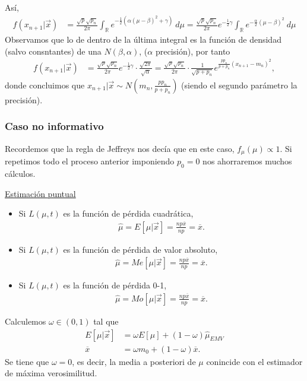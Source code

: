 Así,
\begin{align*}
    f(x_{n+1} | \vec{x}) & = \frac{\sqrt{p}\sqrt{p_n}}{2\pi} \int_{\mathbb{R}} e^{-\frac{1}{2}(\alpha(\mu- \beta)^2 + \gamma)} \ d\mu =  \frac{\sqrt{p}\sqrt{p_n}}{2\pi}e^{-\frac{1}{2}\gamma} \int_{\mathbb{R}} e^{-\frac{\alpha}{2}(\mu- \beta)^2 } \ d\mu
\end{align*}
Observamos que lo de dentro de la última integral es la función de densidad (salvo consntantes) de una $N(\beta,\alpha)$, ($\alpha$ precisión), por tanto
\begin{align*}
    f(x_{n+1} | \vec{x}) & = \frac{\sqrt{p}\sqrt{p_n}}{2\pi}e^{-\frac{1}{2}\gamma} \cdot \frac{\sqrt{2\pi}}{\sqrt{\alpha}} = \frac{\sqrt{p}\sqrt{p_n}}{2\pi} \cdot \frac{1}{\sqrt{p+p_n}}e^{\frac{pp_n}{p+p_n}(x_{n+1} - m_n)^2},
\end{align*}
donde concluimos que $x_{n+1} | \vec{x} \sim N\left( m_n, \frac{pp_n}{p + p_n} \right)$ (siendo el segundo parámetro la precisión).

\subsubsection{Caso no informativo}
Recordemos que la regla de Jeffreys nos decía que en este caso, $f_{\mu}(\mu) \propto 1$. Si repetimos todo el proceso anterior imponiendo $p_0 =0$ nos ahorraremos muchos cálculos.

\underline{Estimación puntual}
\begin{itemize}
    \item Si $L(\mu,t)$ es la función de pérdida cuadrática,
          \begin{align*}
              \widehat{\mu} = E[\mu |  \vec{x}] = \frac{np \overline{x}}{np} = \overline{x}.
          \end{align*}
    \item Si $L(\mu,t)$ es la función de pérdida de valor absoluto,
          \begin{align*}
              \widehat{\mu} = Me[\mu |  \vec{x}] = \frac{np \overline{x}}{np} = \overline{x}.
          \end{align*}
    \item Si $L(\mu,t)$ es la función de pérdida 0-1,
          \begin{align*}
              \widehat{\mu} = Mo[\mu |  \vec{x}] = \frac{np \overline{x}}{np} = \overline{x}.
          \end{align*}
\end{itemize}
Calculemos $\omega \in (0,1)$ tal que
\begin{align*}
    E[\mu  | \vec{x}] & = \omega E[\mu]  + (1 - \omega) \widehat{\mu }_{EMV} \\
    \overline{x}      & = \omega m_0 + (1-\omega) \overline{x}.
\end{align*}
Se tiene que $\omega = 0$, es decir, la media a posteriori de $\mu$ conincide con el estimador de máxima verosimilitud.

